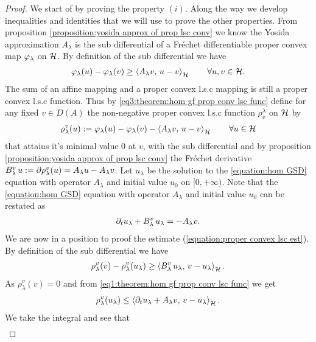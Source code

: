 \begin{proof}
	We start of by proving the property $ (i) $.
	Along the way we develop inequalities and identities that
	we will use to prove the other properties.
	From proposition \ref{proposition:yosida approx of prop lsc conv} we
	know the Yosida approximation $ A_\lambda $
	is the sub differential of a Fréchet differentiable
	proper convex map $ \varphi_\lambda $ on $\mathcal{H}$. By definition of
	the sub differential we have
	\begin{align}\label{eq3:theorem:hom gf prop conv lsc func}
		\varphi_\lambda(u)-\varphi_\lambda(v)\geq\left\langle A_\lambda v,\,u-v\right\rangle_{\mathcal{H}}
		\qquad\forall u,v\in\mathcal{H}.
	\end{align}
	The sum of an affine mapping and a proper convex l.s.c mapping
	is still a proper convex l.s.c function. Thus by 
	\eqref{eq3:theorem:hom gf prop conv lsc func}
	define for any fixed $ v\in D(A) $ 
	the non-negative proper convex l.s.c function $
	 \rho_v^\lambda $ on $ \mathcal{H} $ by
	\begin{align*}
		\rho_\lambda^v(u):=\varphi_\lambda(u)-\varphi_\lambda(v)- \left\langle A_\lambda v,\,u-v\right\rangle_{\mathcal{H}}
		\qquad \forall u\in \mathcal{H}
	\end{align*}
	that attains it's minimal value $0$ at $ v $, with the sub differential
	and by 
	proposition \ref{proposition:yosida approx of prop lsc conv}
	the Fréchet derivative
	$ B_\lambda^v\, u:=\partial \rho_\lambda^v(u)=A_\lambda u-A_\lambda v $. 
	Let $ u_\lambda $ be the solution to the \ref{equation:hom GSD}
	equation with operator $ A_\lambda $ and initial
	value $ u_0 $ on $ [0,\plus\infty) $.
	Note that the \ref{equation:hom GSD} equation with
	operator $ A_\lambda $ and
	initial value $ u_0 $ can be restated as
	\begin{align}\label{eq1:theorem:hom gf prop conv lsc func}
		\partial_t u_\lambda + B_\lambda^v\,u_\lambda=-A_\lambda v.
	\end{align}
	We are now in a position 
	to proof the estimate (\ref{equation:proper convex lsc est}).
	By definition of the sub differential we have
	\begin{align*}
		\rho_\lambda^v(v)-\rho_\lambda^v(u_\lambda)
		\geq \left\langle B_\lambda^v\, u_\lambda,\,v-u_\lambda\right\rangle_{\mathcal{H}}.
	\end{align*}
	As $ \rho_\lambda^v(v)=0 $ and from 
	\eqref{eq1:theorem:hom gf prop conv lsc func} we get
	\begin{align*}
		\rho_\lambda^v(u_\lambda)
		\leq\left\langle \partial_t u_\lambda+A_\lambda v,\,v-u_\lambda\right\rangle_{\mathcal{H}}.
	\end{align*}
	We take the integral and see that
	\begin{align}\label{eq2:theorem:hom gf prop conv lsc func}

\end{align}
\end{proof}
